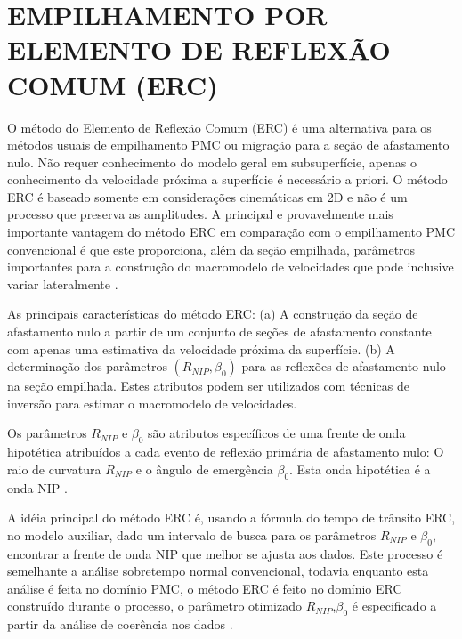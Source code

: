 %
% 
% 
% 
% 
% 
% 

\chapter{EMPILHAMENTO POR ELEMENTO DE REFLEXÃO COMUM (ERC)}

O método do Elemento de Reflexão Comum (ERC) é uma alternativa para os métodos usuais de empilhamento PMC ou
migração para a seção de afastamento nulo. Não requer conhecimento do modelo geral em subsuperfície, apenas
o conhecimento da velocidade próxima a superfície é necessário a priori.
O método ERC é baseado somente em considerações cinemáticas em 2D e não é
um processo que preserva as amplitudes.
A principal e provavelmente mais importante vantagem do método ERC em comparação com o empilhamento PMC convencional
é que este proporciona, além da seção empilhada, parâmetros importantes para a construção do macromodelo de 
velocidades que pode inclusive variar lateralmente \cite{cre}.

As principais características do método ERC:
(a) A construção da seção de afastamento nulo a partir de um conjunto de seções de afastamento constante
com apenas uma estimativa da velocidade próxima da superfície.
(b) A determinação dos parâmetros $(R_{NIP},\beta_0)$ para as reflexões de afastamento nulo na seção empilhada.
Estes atributos podem ser utilizados com técnicas de inversão para estimar o macromodelo de velocidades.

Os parâmetros $R_{NIP}$ e $\beta_0$ 
são atributos específicos de uma frente de onda hipotética atribuídos a cada evento de reflexão
primária de afastamento nulo: O raio de curvatura $R_{NIP}$ e o ângulo de emergência $\beta_0$. Esta onda hipotética é
a onda NIP \cite{hubral}.

A idéia principal do método ERC é, usando a fórmula do tempo de trânsito ERC, no modelo auxiliar, dado um intervalo
de busca para os parâmetros $R_{NIP}$ e $\beta_0$, encontrar a frente de onda NIP que melhor se ajusta aos dados.
Este processo é semelhante a análise sobretempo normal convencional, todavia enquanto esta análise é feita no
domínio PMC, o método ERC é feito no domínio ERC construído durante o processo, o parâmetro otimizado $R_{NIP}$,$\beta_0$
é especificado a partir da análise de coerência nos dados \cite{cre}.



